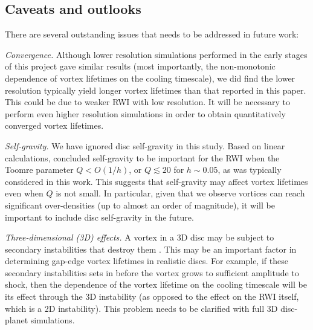 
\subsection{Caveats and outlooks}
There are several outstanding issues that needs to be addressed
in future work: 

\emph{Convergence.} Although lower resolution simulations performed in
the early stages of this project gave similar results  
(most importantly, the non-monotonic dependence of vortex lifetimes on
the cooling timescale), we did find the lower resolution 
typically yield longer vortex lifetimes than that reported in this
paper. This could be due to weaker RWI with low resolution.  
It will be necessary to perform even higher resolution  simulations
in order to obtain quantitatively converged vortex lifetimes.  
 
\emph{Self-gravity.} We have ignored disc self-gravity in this
study. Based on linear calculations, \cite{lovelace13} concluded
self-gravity to be important for the RWI when the Toomre parameter $Q<O(1/h)$, or
$Q\lesssim 20$ for $h\sim0.05$, as was typically considered in this
work. This suggests that self-gravity may affect vortex lifetimes even
when $Q$ is not small. In particular, given that
we observe vortices can reach significant over-densities (up to almost
an order of magnitude), it will be important to include disc
self-gravity in the future. %
 
\emph{Three-dimensional (3D) effects.} A vortex in a 3D disc may be
subject to secondary instabilities that destroy them
\citep{lesur09,railton14}. This may be an important factor in
determining gap-edge vortex lifetimes in realistic discs. For example,
if these secondary instabilities sets in before the vortex grows to
sufficient amplitude to shock, then the dependence of the vortex
lifetime on the cooling timescale will be its effect through the 3D
instability (as opposed to the effect on the RWI itself, which is a 2D
instability). This problem needs to be clarified with full 3D
disc-planet simulations.  


